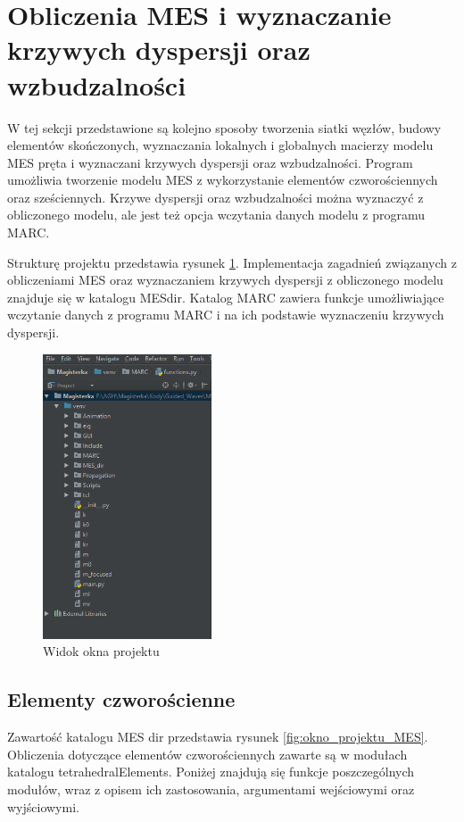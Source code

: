 \section{Obliczenia MES i wyznaczanie krzywych dyspersji oraz wzbudzalności}
\label{cha:obliczenia_mes}

W tej sekcji przedstawione są kolejno sposoby tworzenia siatki węzłów, budowy elementów skończonych, wyznaczania lokalnych i globalnych macierzy modelu MES pręta i wyznaczani krzywych dyspersji oraz wzbudzalności. Program umożliwia tworzenie modelu MES z wykorzystanie elementów czworościennych oraz sześciennych. Krzywe dyspersji oraz wzbudzalności można wyznaczyć z obliczonego modelu, ale jest też opcja wczytania danych modelu z programu MARC.

Strukturę projektu przedstawia rysunek \ref{fig:okno_projektu}. Implementacja zagadnień związanych z obliczeniami MES oraz wyznaczaniem krzywych dyspersji z obliczonego modelu znajduje się w katalogu MES\textunderscore dir. Katalog MARC zawiera funkcje umożliwiające wczytanie danych z programu MARC i na ich podstawie wyznaczeniu krzywych dyspersji.

\begin{figure}[h]
\centering
\includegraphics[width=5cm]{Zdjecia/5/okno_projektu}
\caption{Widok okna projektu}
\label{fig:okno_projektu}
\end{figure}

\subsection{Elementy czworościenne}
\label{cha:elementy czworościenne}

Zawartość katalogu MES dir przedstawia rysunek \ref{fig:okno_projektu_MES}. Obliczenia dotyczące elementów czworościennych zawarte są w modułach katalogu tetrahedralElements. Poniżej znajdują się funkcje poszczególnych modułów, wraz z opisem ich zastosowania, argumentami wejściowymi oraz wyjściowymi.

